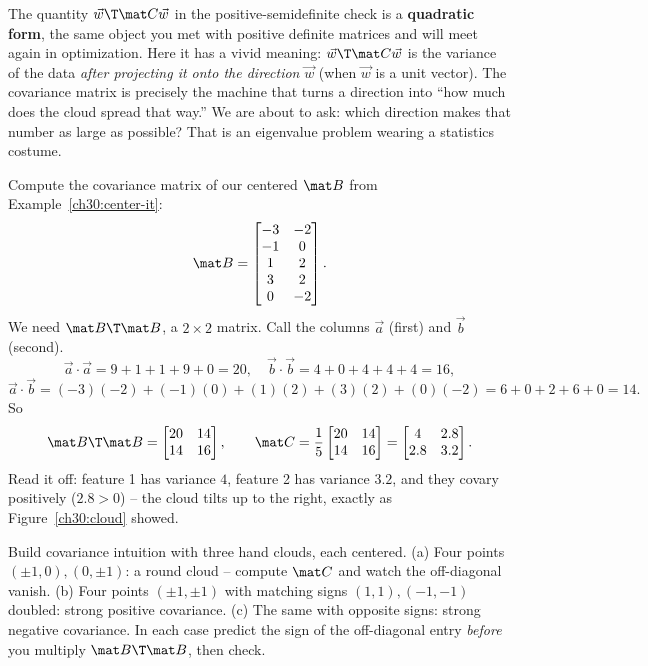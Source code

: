 \begin{connectionbox}
The quantity $\vec w\T\mat C\vec w$ in the positive-semidefinite check is a
\textbf{quadratic form}, the same object you met with positive definite matrices
and will meet again in optimization. Here it has a vivid meaning: $\vec w\T\mat C\vec
w$ is the variance of the data \emph{after projecting it onto the direction}
$\vec w$ (when $\vec w$ is a unit vector). The covariance matrix is precisely the
machine that turns a direction into ``how much does the cloud spread that way.''
We are about to ask: which direction makes that number as large as possible? That
is an eigenvalue problem wearing a statistics costume.
\end{connectionbox}

\begin{example}\label{ch30:cov-compute}
Compute the covariance matrix of our centered $\mat B$ from
Example~\ref{ch30:center-it}:
\[
  \mat B =
  \begin{bmatrix}
    -3 & -2\\ -1 & 0\\ 1 & 2\\ 3 & 2\\ 0 & -2
  \end{bmatrix}.
\]
We need $\mat B\T\mat B$, a $2\times2$ matrix. Call the columns $\vec a$ (first)
and $\vec b$ (second).
\[
  \vec a\cdot\vec a = 9+1+1+9+0 = 20,\quad
  \vec b\cdot\vec b = 4+0+4+4+4 = 16,
\]
\[
  \vec a\cdot\vec b = (-3)(-2)+(-1)(0)+(1)(2)+(3)(2)+(0)(-2)=6+0+2+6+0=14.
\]
So
\[
  \mat B\T\mat B=\begin{bmatrix}20 & 14\\ 14 & 16\end{bmatrix},
  \qquad
  \mat C=\frac15\begin{bmatrix}20 & 14\\ 14 & 16\end{bmatrix}
        =\begin{bmatrix}4 & 2.8\\ 2.8 & 3.2\end{bmatrix}.
\]
Read it off: feature 1 has variance $4$, feature 2 has variance $3.2$, and they
covary positively ($2.8>0$) -- the cloud tilts up to the right, exactly as
Figure~\ref{ch30:cloud} showed.
\end{example}

\begin{labbox}
Build covariance intuition with three hand clouds, each centered. (a) Four points
$(\pm1,0),(0,\pm1)$: a round cloud -- compute $\mat C$ and watch the off-diagonal
vanish. (b) Four points $(\pm1,\pm1)$ with matching signs $(1,1),(-1,-1)$ doubled:
strong positive covariance. (c) The same with opposite signs: strong negative
covariance. In each case predict the sign of the off-diagonal entry \emph{before}
you multiply $\mat B\T\mat B$, then check.
\end{labbox}

